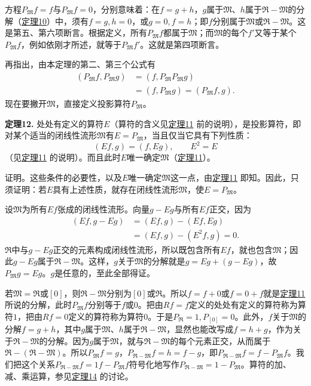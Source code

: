 \documentclass[fontsize=13pt,twoside,openany,headings=normal,parskip=false,bookmarkpackage=false,DIV=calc]{scrbook}
\newcommand{\textkaishu}[1]{{\zhkaishu #1}}
\begin{document}
\hypertarget{origpage-41}{}\label{origpage-41}方程$P_{\mathfrak{M}}f=f$与$P_{\mathfrak{M}}f=0$，分别意味着：在$f=g+h$，$g$属于$\mathfrak{M}$、$h$属于$\mathfrak{R}-\mathfrak{M}$的分解（\hyperref[thm:II.10]{定理10}）中，须有$f=g,\allowbreak h=0$，或$g=0,\allowbreak f=h$；即$f$分别属于$\mathfrak{M}$或$\mathfrak{R}-\mathfrak{M}$。这是第五、第六项断言。根据定义，所有$P_{\mathfrak{M}}f$都属于$\mathfrak{M}$；而$\mathfrak{M}$的每个$f'$又等于某个$P_{\mathfrak{M}}f$，例如依刚才所述，就等于$P_{\mathfrak{M}}f'$。这就是第四项断言。

再指出，由本定理的第二、第三个公式有
\begin{align*}
(P_{\mathfrak{M}}f,P_{\mathfrak{M}}g)&=(f,P_{\mathfrak{M}}P_{\mathfrak{M}}g)\\
&=(f,P_{\mathfrak{M}}g)=(P_{\mathfrak{M}}f,g).
\end{align*}
现在要撇开$\mathfrak{M}$，直接定义投影算符$P_{\mathfrak{M}}$。

\leavevmode{}\textbf{定理12.}\label{thm:II.12} 处处有定义的算符$E$（算符的含义见\CJKglue \hyperref[thm:II.11]{定理11} 前的说明），是投影算符，即对某个适当的闭线性流形$\mathfrak{M}$有$E=P_{\mathfrak{M}}$，当且仅当它具有下列性质：
\[
(Ef,g)=(f,Eg),\qquad E^2=E
\]
（见\CJKglue \hyperref[thm:II.11]{定理11} 的说明）。而且此时$E$唯一确定$\mathfrak{M}$（\hyperref[thm:II.11]{定理11}）。

\textkaishu{证明。}这些条件的必要性，以及$E$唯一确定$\mathfrak{M}$这一点，由\CJKglue \hyperref[thm:II.11]{定理11} 即知。因此，只须证明：若$E$具有上述性质，就存在闭线性流形$\mathfrak{M}$，使$E=P_{\mathfrak{M}}$。

设$\mathfrak{M}$为所有$Ef$张成的闭线性流形。向量$g-Eg$与所有$Ef$正交，因为
\begin{align*}
(Ef,g-Eg)&=(Ef,g)-(Ef,Eg)\\
&=(Ef,g)-(E^2f,g)=0.
\end{align*}
$\mathfrak{R}$中与$g-Eg$正交的元素构成闭线性流形，所以既包含所有$Ef$，就也包含$\mathfrak{M}$；因此$g-Eg$属于$\mathfrak{R}-\mathfrak{M}$。这样，$g$关于$\mathfrak{M}$的分解就是$g=Eg+(g-Eg)$，故$P_{\mathfrak{M}}g=Eg$。$g$是任意的，至此全部得证。

若$\mathfrak{M}=\mathfrak{R}$或$[0]$，则$\mathfrak{R}-\mathfrak{M}$分别为$[0]$或$\mathfrak{R}$。所以$f=f+0$或$f=0+f$就是\CJKglue \hyperref[thm:II.11]{定理11} 所说的分解，此时$P_{\mathfrak{M}}f$分别等于$f$或$0$。把由$Rf=f$定义的处处有定义的算符称为算符$1$，把由$Rf=0$定义的算符称为算符$0$。于是$P_{\mathfrak{R}}=1,\allowbreak P_{[0]}=0$。此外，$f$关于$\mathfrak{M}$的分解$f=g+h$，其中$g$属于$\mathfrak{M}$、$h$属于$\mathfrak{R}-\mathfrak{M}$，显然也能改写成$f=h+g$，作为关于$\mathfrak{R}-\mathfrak{M}$的分解。因为$g$属于$\mathfrak{M}$，就与$\mathfrak{R}-\mathfrak{M}$的每个元素正交，从而属于$\mathfrak{R}-(\mathfrak{R}-\mathfrak{M})$。所以$P_{\mathfrak{M}}f=g$，$P_{\mathfrak{R}-\mathfrak{M}}f=h=f-g$，即$P_{\mathfrak{R}-\mathfrak{M}}f=f-P_{\mathfrak{M}}f$。我们把这个关系$P_{\mathfrak{R}-\mathfrak{M}}f=1f-P_{\mathfrak{M}}f$符号化地写作$P_{\mathfrak{R}-\mathfrak{M}}=1-P_{\mathfrak{M}}$。算符的加、减、乘运算，参见\CJKglue \hyperref[thm:II.14]{定理14} 的讨论。
\end{document}
